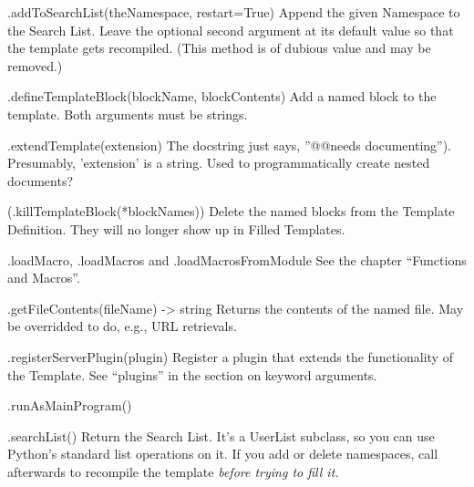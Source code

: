 \begin{description}

\item{.addToSearchList(theNamespace, restart=True)}  Append the given Namespace
     to the Search List.  Leave the optional second argument at its default
     value so that the template gets recompiled.  (This method is of dubious
     value and may be removed.)

\item{.defineTemplateBlock(blockName, blockContents)}  Add a named block to the
template.  Both arguments must be strings.


\item{.extendTemplate(extension)}  The docstring just says, ''@@needs
     documenting'').  Presumably, 'extension' is a string.  Used to 
     programmatically create nested documents?

\item(.killTemplateBlock(*blockNames))  Delete the named blocks from the 
Template Definition.  They will no longer show up in Filled Templates.


\item{.loadMacro, .loadMacros and .loadMacrosFromModule}  See the chapter
     ``Functions and Macros''.

\item{.getFileContents(fileName) -> string}  Returns the contents of the named
     file.  May be overridded to do, e.g., URL retrievals.

\item{.registerServerPlugin(plugin)}  Register a plugin that extends the
     functionality of the Template.  See ``plugins'' in the section on keyword
     arguments.

\item{.runAsMainProgram()}

\item{.searchList()}  Return the Search List.  It's a UserList subclass, so you
     can use Python's standard list operations on it.  If you add or delete
     namespaces, call  afterwards to recompile the template
     \em{before trying to fill it}.


\end{description}
